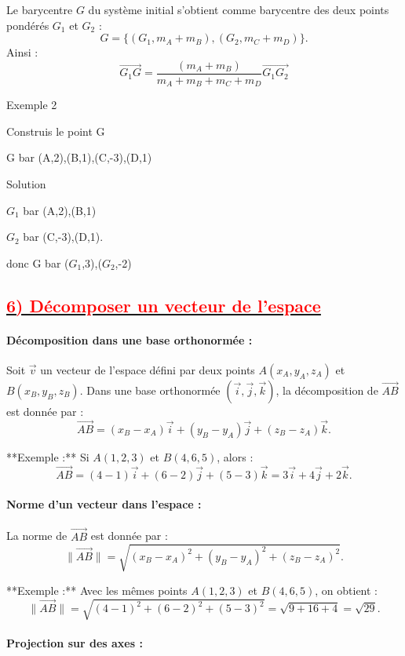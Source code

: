 \documentclass{article}
\begin{document}
   Le barycentre \( G \) du système initial s’obtient comme barycentre des deux points pondérés \( G_1 \) et \( G_2 \) :  
   \[
   G = \{(G_{1}, m_A + m_B), (G_{2}, m_C + m_D)\}.
   \]
   Ainsi :  
   \[
   \overrightarrow{G_{1}G} = \frac{(m_A + m_B) }{m_A + m_B+m_C + m_D}\overrightarrow{G_{1}G_{2}}
   \]

Exemple 2

Construis le point G

G bar (A,2),(B,1),(C,-3),(D,1)

Solution

$G_{1}$ bar (A,2),(B,1)

$G_{2}$ bar (C,-3),(D,1).

donc G bar ($G_{1}$,3),($G_{2}$,-2)

\subsection*{\underline{\textbf{\textcolor{red}{6) Décomposer un vecteur de l’espace}}}}

\paragraph{Décomposition dans une base orthonormée :}

Soit \( \vec{v} \) un vecteur de l’espace défini par deux points \( A(x_A, y_A, z_A) \) et \( B(x_B, y_B, z_B) \).  
Dans une base orthonormée \((\vec{i}, \vec{j}, \vec{k})\), la décomposition de \( \overrightarrow{AB} \) est donnée par :  
\[
\overrightarrow{AB} = (x_B - x_A) \vec{i} + (y_B - y_A) \vec{j} + (z_B - z_A) \vec{k}.
\]

**Exemple :**  
Si \( A(1, 2, 3) \) et \( B(4, 6, 5) \), alors :  
\[
\overrightarrow{AB} = (4 - 1)\vec{i} + (6 - 2)\vec{j} + (5 - 3)\vec{k} = 3\vec{i} + 4\vec{j} + 2\vec{k}.
\]

\paragraph{Norme d’un vecteur dans l’espace :}

La norme de \( \overrightarrow{AB} \) est donnée par :  
\[
\|\overrightarrow{AB}\| = \sqrt{(x_B - x_A)^2 + (y_B - y_A)^2 + (z_B - z_A)^2}.
\]

**Exemple :**  
Avec les mêmes points \( A(1, 2, 3) \) et \( B(4, 6, 5) \), on obtient :  
\[
\|\overrightarrow{AB}\| = \sqrt{(4-1)^2 + (6-2)^2 + (5-3)^2} = \sqrt{9 + 16 + 4} = \sqrt{29}.
\]

\paragraph{Projection sur des axes :}
\end{document}
